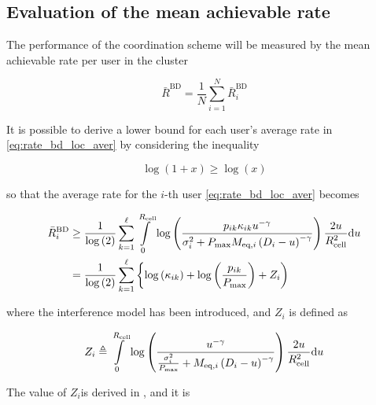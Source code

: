\subsection{Evaluation of the mean achievable rate}\label{ssec:achiev_rate_eval}

The performance of the coordination scheme will be measured by the mean
achievable rate per user in the cluster

\begin{equation} \label{eq:mean_achiev_rate_def}
    \bar{R}^{\text{BD}} = \frac{1}{N} \sum\limits_{i = 1}^N
    \bar{R}_i^{\text{BD}}  
\end{equation}

It is possible to derive a lower bound for each user's average rate in
\eqref{eq:rate_bd_loc_aver} by considering the inequality

\begin{equation} \label{eq:log_ineq}
    \log\left(1+x\right) \geq \log\left(x\right)
\end{equation}

\noindent
so that the average rate for the $i$-th user \eqref{eq:rate_bd_loc_aver} becomes

\begin{equation} \label{eq:rate_bd_i_logapprox}
    \begin{aligned}
    \bar{R}_i^{\text{BD}} &\geq \frac{1}{\log\left(2\right)} \sum\limits_{k = 1}
    ^{\ell} \int\limits_0^{R_{\text{cell}}} \log\left(\frac{p_{ik}\kappa_{ik}u^{-\gamma}}
    {\sigma_i^2 + P_{\max}M_{\text{eq},i}\left(D_i - u\right)^{-\gamma}}\right)\frac{2u}
        {R_{\text{cell}}^2}\text{d} u \\
        &=\frac{1}{\log\left(2\right)}\sum\limits_{k=1}^{\ell}\left\{\log\left(
    \kappa_{ik}\right) + \log\left(\frac{p_{ik}}{P_{\max}}\right) + Z_i
    \right)
    \end{aligned}
\end{equation}

\noindent
where the interference model has been introduced, and $Z_i$ is defined as

\begin{equation} \label{eq:zi_def}
    Z_i \triangleq \int\limits_0^{R_{\text{cell}}}\log\left(\frac{u^{-\gamma}}
        {\frac{\sigma_i^2}{P_{\max}} + M_{\text{eq},i}\left(D_i - u\right)^{-\gamma}}
    \right)\frac{2u}{R_{\text{cell}}^2} \text{d} u
\end{equation}

The value of $Z_i$is derived in , and it is

